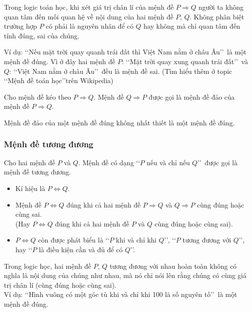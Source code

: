 \begin{tomtat}
\begin{note}
	Trong logic toán học, khi xét giá trị chân lí của mệnh đề $P\Rightarrow Q$ người ta không quan tâm đến mối quan hệ về nội dung của hai mệnh đề $P$, $Q$. Không phân biệt trường hợp $P$ có phải là nguyên nhân để có $Q$ hay không mà chỉ quan tâm đến tính đúng, sai của chúng.
	
	Ví dụ: \lq\lq  Nếu mặt trời quay quanh trái đất thì Việt Nam nằm ở châu Âu\rq\rq\ là một mệnh đề đúng. Vì ở đây hai mệnh đề $P$: \lq\lq  Mặt trời quay xung quanh trái đất\rq\rq\ và $Q$: \lq\lq  Việt Nam nằm ở châu Âu\rq\rq\ đều là mệnh đề sai.
	(Tìm hiểu thêm ở topic \lq\lq  Mệnh đề toán học\rq\rq trên Wikipedia)
\end{note}

\begin{boxdn}{}
	Cho mệnh đề kéo theo $P\Rightarrow Q$. Mệnh đề $Q\Rightarrow P$ được gọi là mệnh đề đảo của mệnh đề $P\Rightarrow Q$.
\end{boxdn}

\begin{note}
	Mệnh đề đảo của một mệnh đề đúng không nhất thiết là một mệnh đề đúng.
\end{note}

\subsubsection{Mệnh đề tương đương}

\begin{boxdn}{}
	Cho hai mệnh đề $P$ và $Q$. Mệnh đề có dạng \lq\lq  $P$ nếu và chỉ nếu $Q$\rq\rq\ được gọi là mệnh đề tương đương.
	\begin{itemize}
		\item Kí hiệu là $P \Leftrightarrow Q$.
		\item Mệnh đề $P \Leftrightarrow Q$ đúng khi cả hai mệnh đề $P\Rightarrow Q$ và $Q \Rightarrow P$ cùng đúng hoặc cùng sai. \\
		(Hay $P \Leftrightarrow Q$ đúng khi cả hai mệnh đề $P$ và $Q$ cùng đúng hoặc cùng sai).
		\item $P\Leftrightarrow Q$ còn được phát biểu là \lq\lq  $P$ khi và chỉ khi $Q$\rq\rq, \lq\lq  $P$ tương đương với $Q$\rq\rq, hay \lq\lq  $P$ là điều kiện cần và đủ để có $Q$\rq\rq.
	\end{itemize}
\end{boxdn}

\begin{note}
	Trong logic học, hai mệnh đề $P$, $Q$ tương đương với nhau hoàn toàn không có nghĩa là nội dung của chúng như nhau, mà nó chỉ nói lên rằng chúng có cùng giá trị chân lí (cùng đúng hoặc cùng sai).\\
	Ví dụ: \lq\lq  Hình vuông có một góc tù khi và chỉ khi 100 là số nguyên tố\rq\rq\ là một mệnh đề đúng.
\end{note}


\end{tomtat}
